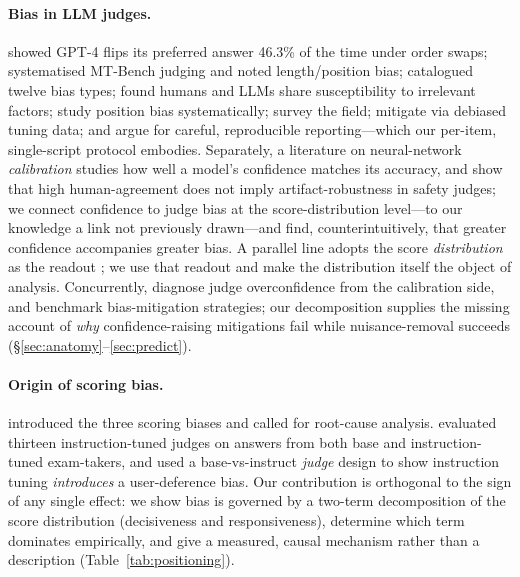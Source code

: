 \documentclass[11pt]{article}
\begin{document}
\paragraph{Bias in LLM judges.} \citet{wang2023large} showed GPT-4 flips its
preferred answer 46.3\% of the time under order swaps; \citet{zheng2023judging}
systematised MT-Bench judging and noted length/position bias; \citet{ye2024justice}
catalogued twelve bias types; \citet{chen2024humans} found humans and LLMs share
susceptibility to irrelevant factors; \citet{shi2024position} study position bias
systematically; \citet{gu2024survey} survey the field; \citet{park2024offsetbias}
mitigate via debiased tuning data; and \citet{lee2025correctly} argue for careful,
reproducible reporting---which our per-item, single-script protocol embodies. Separately,
a literature on neural-network \emph{calibration} \citep{guo2017calibration,kadavath2022know}
studies how well a model's confidence matches its accuracy, and \citet{saferluckier2025}
show that high human-agreement does not imply artifact-robustness in safety judges; we
connect confidence to judge bias at the score-distribution level---to our knowledge a
link not previously drawn---and find, counterintuitively, that greater confidence
accompanies greater bias. A parallel line adopts the score \emph{distribution} as the
readout \citep{liu2023geval,wang2025judgmentdist,trustjudge2025}; we use that readout
and make the distribution itself the object of analysis. Concurrently,
\citet{tian2025overconfidence} diagnose judge overconfidence from the calibration side,
and \citet{soumik2026judging} benchmark bias-mitigation strategies; our decomposition
supplies the missing account of \emph{why} confidence-raising mitigations fail while
nuisance-removal succeeds (\S\ref{sec:anatomy}--\ref{sec:predict}).

\paragraph{Origin of scoring bias.} \citet{li2025scoring} introduced the three
scoring biases and called for root-cause analysis. \citet{thakur2024judging} evaluated
thirteen instruction-tuned judges on answers from both base and instruction-tuned
exam-takers, and \citet{pan2025user} used a base-vs-instruct \emph{judge} design to
show instruction tuning \emph{introduces} a user-deference bias. Our
contribution is orthogonal to the sign of any single effect: we show bias is governed
by a two-term decomposition of the score distribution (decisiveness and responsiveness),
determine which term dominates empirically, and give a measured, causal mechanism rather
than a description (Table~\ref{tab:positioning}).
\end{document}
